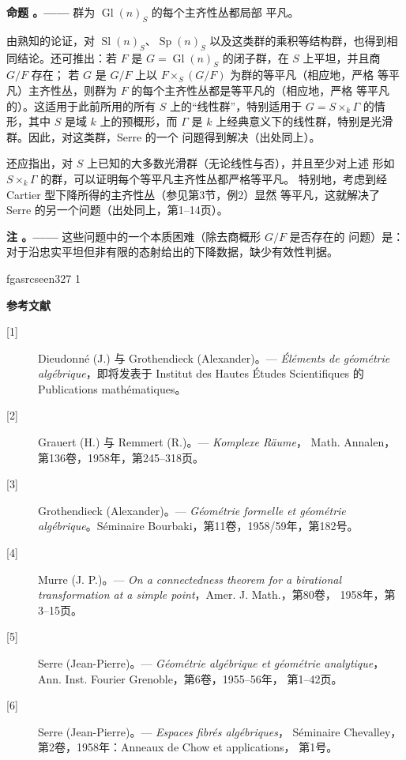 \documentclass[12pt,twoside,openany]{book}
\numberwithin{equation}{section}
\newcommand{\fgaunitid}{unbound}
\newcommand{\src}[1]{%
  \phantomsection
  \hypertarget{src:\fgaunitid:#1}{}%
  \hypertarget{fga.\fgaunitid.p#1}{}%
  \ifcsname fgasrcseen#1\endcsname\else
    \expandafter\gdef\csname fgasrcseen#1\endcsname{1}%
    \hypertarget{src:#1}{}%
  \fi
  \marginpar{\raggedleft\footnotesize\sffamily #1}%
}
\newcommand{\fquote}[1]{“#1”}
\theoremstyle{plain}
\theoremstyle{definition}
\theoremstyle{remark}
\newcommand{\result}[2]{%
  \par\medskip\noindent\textbf{#1%
  \if\relax\detokenize{#2}\relax\else\space#2\fi。——}\enspace
}
\begin{document}
\result{命题}{6.1} 群为 $\operatorname{Gl}(n)_S$ 的每个主齐性丛都局部
平凡。

由熟知的论证，对 $\operatorname{Sl}(n)_S$、$\operatorname{Sp}(n)_S$
以及这类群的乘积等结构群，也得到相同结论。还可推出：若 $F$ 是
$G=\operatorname{Gl}(n)_S$ 的闭子群，在 $S$ 上平坦，并且商 $G/F$ 存在；
若 $G$ 是 $G/F$ 上以 $F\times_S(G/F)$ 为群的等平凡（相应地，严格
等平凡）主齐性丛，则群为 $F$ 的每个主齐性丛都是等平凡的（相应地，严格
等平凡的）。这适用于此前所用的所有 $S$ 上的\fquote{线性群}，特别适用于
$G=S\times_k\Gamma$ 的情形，其中 $S$ 是域 $k$ 上的预概形，而 $\Gamma$
是 $k$ 上经典意义下的线性群，特别是光滑群。因此，对这类群，Serre 的一个
问题得到解决（出处同上）。

还应指出，对 $S$ 上已知的大多数光滑群（无论线性与否），并且至少对上述
形如 $S\times_k\Gamma$ 的群，可以证明每个等平凡主齐性丛都严格等平凡。
特别地，考虑到经 Cartier 型下降所得的主齐性丛（参见第3节，例2）显然
等平凡，这就解决了 Serre 的另一个问题（出处同上，第1--14页）。

\result{注}{} 这些问题中的一个本质困难（除去商概形 $G/F$ 是否存在的
问题）是：对于沿忠实平坦但非有限的态射给出的下降数据，缺少有效性判据。

\src{327}
\begin{center}
  \textbf{参考文献}
\end{center}

\begin{description}
  \item[{[1]}] Dieudonné (J.) 与 Grothendieck (Alexander)。---
    \emph{Éléments de géométrie algébrique}，即将发表于 Institut des
    Hautes Études Scientifiques 的 Publications mathématiques。
  \item[{[2]}] Grauert (H.) 与 Remmert (R.)。--- \emph{Komplexe Räume}，
    Math. Annalen，第136卷，1958年，第245--318页。
  \item[{[3]}] Grothendieck (Alexander)。--- \emph{Géométrie formelle et
    géométrie algébrique}。Séminaire Bourbaki，第11卷，1958/59年，第182号。
  \item[{[4]}] Murre (J. P.)。--- \emph{On a connectedness theorem for a
    birational transformation at a simple point}，Amer. J. Math.，第80卷，
    1958年，第3--15页。
  \item[{[5]}] Serre (Jean-Pierre)。--- \emph{Géométrie algébrique et
    géométrie analytique}，Ann. Inst. Fourier Grenoble，第6卷，1955--56年，
    第1--42页。
  \item[{[6]}] Serre (Jean-Pierre)。--- \emph{Espaces fibrés algébriques}，
    Séminaire Chevalley，第2卷，1958年：Anneaux de Chow et applications，
    第1号。
\end{description}
\end{document}
